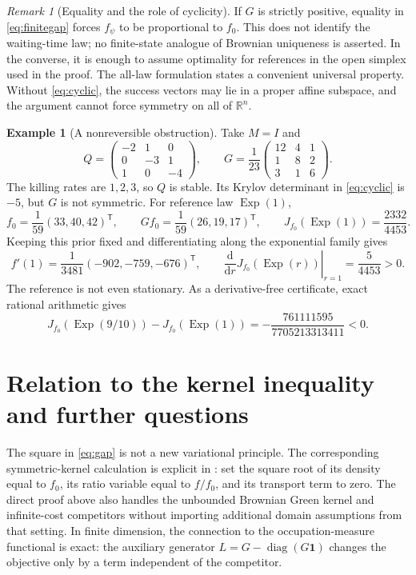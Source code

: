 \documentclass[11pt]{amsart}
\theoremstyle{definition}
\newtheorem{example}[theorem]{Example}
\theoremstyle{remark}
\newtheorem{remark}[theorem]{Remark}
\newcommand{\R}{\mathbb R}
\newcommand{\one}{\mathbf 1}
\newcommand{\Exp}{\operatorname{Exp}}
\newcommand{\diag}{\operatorname{diag}}
\begin{document}
\begin{remark}[Equality and the role of cyclicity]
If $G$ is strictly positive, equality in \eqref{eq:finitegap} forces $f_\psi$ to be proportional to $f_0$. This does not identify the waiting-time law; no finite-state analogue of Brownian uniqueness is asserted. In the converse, it is enough to assume optimality for references in the open simplex used in the proof. The all-law formulation states a convenient universal property. Without \eqref{eq:cyclic}, the success vectors may lie in a proper affine subspace, and the argument cannot force symmetry on all of $\R^n$.
\end{remark}

\begin{example}[A nonreversible obstruction]\label{ex:obstruction}
Take $M=I$ and
\[
 Q=\begin{pmatrix}-2&1&0\\0&-3&1\\1&0&-4\end{pmatrix},
 \qquad
 G=\frac1{23}\begin{pmatrix}12&4&1\\1&8&2\\3&1&6\end{pmatrix}.
\]
The killing rates are $1,2,3$, so $Q$ is stable. Its Krylov determinant in \eqref{eq:cyclic} is $-5$, but $G$ is not symmetric. For reference law $\Exp(1)$,
\[
 f_0=\frac1{59}(33,40,42)^{\mathsf T},\qquad
 Gf_0=\frac1{59}(26,19,17)^{\mathsf T},\qquad
 J_{f_0}(\Exp(1))=\frac{2332}{4453}.
\]
Keeping this prior fixed and differentiating along the exponential family gives
\[
 f'(1)=\frac1{3481}(-902,-759,-676)^{\mathsf T},\qquad
 \left.\frac{\mathrm d}{\mathrm dr}J_{f_0}(\Exp(r))\right|_{r=1}=\frac5{4453}>0.
\]
The reference is not even stationary. As a derivative-free certificate, exact rational arithmetic gives
\[
 J_{f_0}(\Exp(9/10))-J_{f_0}(\Exp(1))
 =-\frac{761111595}{7705213313411}<0.
\]
\end{example}

\section{Relation to the kernel inequality and further questions}

The square in \eqref{eq:gap} is not a new variational principle. The corresponding symmetric-kernel calculation is explicit in \cite[Lemma~4.3]{DavilaTopp2023}: set the square root of its density equal to $f_0$, its ratio variable equal to $f/f_0$, and its transport term to zero. The direct proof above also handles the unbounded Brownian Green kernel and infinite-cost competitors without importing additional domain assumptions from that setting. In finite dimension, the connection to the occupation-measure functional is exact: the auxiliary generator $L=G-\diag(G\one)$ changes the objective only by a term independent of the competitor.
\end{document}
